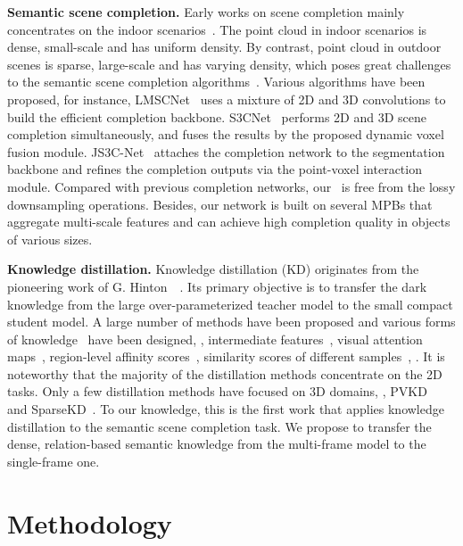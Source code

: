 \documentclass[10pt,twocolumn,letterpaper]{article}
\begin{document}
\noindent \textbf{Semantic scene completion.} Early works on scene completion mainly concentrates on the indoor scenarios~\cite{survey_point_cloud_completion,sscnet,scancomplete,satnet}. The point cloud in indoor scenarios is dense, small-scale and has uniform density. By contrast, point cloud in outdoor scenes is sparse, large-scale and has varying density, which poses great challenges to the semantic scene completion algorithms~\cite{completion_survey,s3cnet,js3cnet,ssa-sc,wilson2022motionsc}. Various algorithms have been proposed, for instance, LMSCNet~\cite{lmscnet} uses a mixture of 2D and 3D convolutions to build the efficient completion backbone. S3CNet~\cite{s3cnet} performs 2D and 3D scene completion simultaneously, and fuses the results by the proposed dynamic voxel fusion module. JS3C-Net~\cite{js3cnet} attaches the completion network to the segmentation backbone and refines the completion outputs via the point-voxel interaction module. Compared with previous completion networks, our \algorithmname~is free from the lossy downsampling operations. Besides, our network is built on several MPBs that aggregate multi-scale features and can achieve high completion quality in objects of various sizes. 





\noindent \textbf{Knowledge distillation.} Knowledge distillation (KD) originates from the pioneering work of G. Hinton~\etal~\cite{hinton2015distilling}. Its primary objective is to transfer the dark knowledge from the large over-parameterized teacher model to the small compact student model. A large number of methods have been proposed and various forms of knowledge~\cite{romero2015fitnets,zagoruyko2016paying,tung2019similarity,xu2022mind} have been designed, \eg, intermediate features~\cite{romero2015fitnets,fmnet}, visual attention maps~\cite{zagoruyko2016paying,sad}, region-level affinity scores~\cite{hou2020inter}, similarity scores of different samples~\cite{tung2019similarity,xing2021categorical}, \etc. It is noteworthy that the majority of the distillation methods concentrate on the 2D tasks. Only a few distillation methods have focused on 3D domains, \eg, PVKD~\cite{pvkd2022} and SparseKD~\cite{sparsekd}. To our knowledge, this is the first work that applies knowledge distillation to the semantic scene completion task. We propose to transfer the dense, relation-based semantic knowledge from the multi-frame model to the single-frame one. %
 
\section{Methodology}
\label{sec:methodology}
\end{document}

